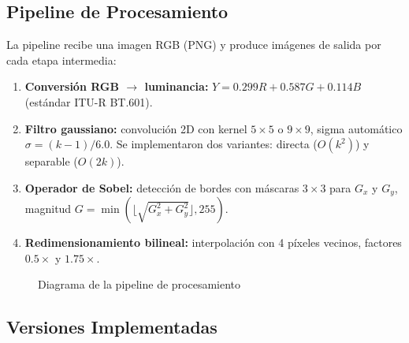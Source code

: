 \documentclass[12pt,a4paper]{article}
\begin{document}
\subsection{Pipeline de Procesamiento}

La pipeline recibe una imagen RGB (PNG) y produce im\'agenes de salida por cada etapa intermedia:

\begin{enumerate}
  \item \textbf{Conversi\'on RGB $\rightarrow$ luminancia:} $Y = 0.299R + 0.587G + 0.114B$ (est\'andar ITU-R BT.601).
  \item \textbf{Filtro gaussiano:} convoluci\'on 2D con kernel $5 \times 5$ o $9 \times 9$, sigma autom\'atico $\sigma = (k-1)/6.0$. Se implementaron dos variantes: directa ($O(k^2)$) y separable ($O(2k)$).
  \item \textbf{Operador de Sobel:} detecci\'on de bordes con m\'ascaras $3\times3$ para $G_x$ y $G_y$, magnitud $G = \min(\lfloor\sqrt{G_x^2+G_y^2}\rfloor, 255)$.
  \item \textbf{Redimensionamiento bilineal:} interpolaci\'on con 4 p\'ixeles vecinos, factores $0.5\times$ y $1.75\times$.
\end{enumerate}

\begin{figure}[H]
\centering
{}
\caption{Diagrama de la pipeline de procesamiento}
\end{figure}

\subsection{Versiones Implementadas}
\end{document}
